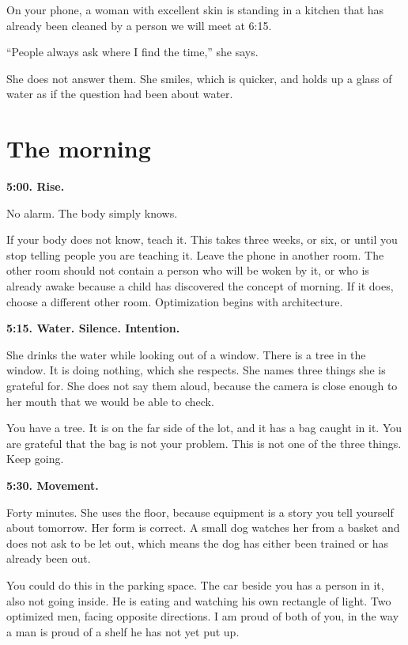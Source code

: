 \documentclass[11pt,oneside]{book}
\begin{document}
On your phone, a woman with excellent skin is standing in a kitchen that has already been cleaned by a person we will meet at 6:15.

``People always ask where I find the time,'' she says.

She does not answer them. She smiles, which is quicker, and holds up a glass of water as if the question had been about water.

\section*{The morning}

\textbf{5:00. Rise.}

No alarm. The body simply knows.

If your body does not know, teach it. This takes three weeks, or six, or until you stop telling people you are teaching it. Leave the phone in another room. The other room should not contain a person who will be woken by it, or who is already awake because a child has discovered the concept of morning. If it does, choose a different other room. Optimization begins with architecture.

\textbf{5:15. Water. Silence. Intention.}

She drinks the water while looking out of a window. There is a tree in the window. It is doing nothing, which she respects. She names three things she is grateful for. She does not say them aloud, because the camera is close enough to her mouth that we would be able to check.

You have a tree. It is on the far side of the lot, and it has a bag caught in it. You are grateful that the bag is not your problem. This is not one of the three things. Keep going.

\textbf{5:30. Movement.}

Forty minutes. She uses the floor, because equipment is a story you tell yourself about tomorrow. Her form is correct. A small dog watches her from a basket and does not ask to be let out, which means the dog has either been trained or has already been out.

You could do this in the parking space. The car beside you has a person in it, also not going inside. He is eating and watching his own rectangle of light. Two optimized men, facing opposite directions. I am proud of both of you, in the way a man is proud of a shelf he has not yet put up.
\end{document}
